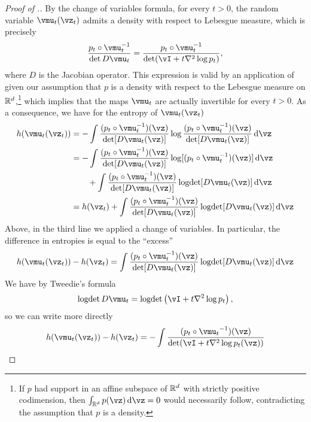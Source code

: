 \documentclass[../../book-main.tex]{subfiles}
\begin{document}
\begin{proof}[Proof of {}.]
  By the change of variables formula, for every $t>0$, the random variable
  $\vmu_t(\vz_t)$ admits a density with respect to Lebesgue measure, which is
  precisely
  \begin{equation*}
    \frac{p_t \circ \vmu_t^{-1}}{\det D \vmu_t}
    =
    \frac{p_t \circ \vmu_t^{-1}}{\det(\vI + t \nabla^2 \log p_t)},
  \end{equation*}
  where \(D\) is the Jacobian operator.
  This expression is valid by an application of \cite[Lemma
  II.1]{Gribonval2011-pf} given our assumption that $p$ is a density with respect
  to the Lebesgue measure on $\mathbb{R}^d$,\footnote{If $p$ had support in an affine
  subspace of $\mathbb{R}^d$ with strictly positive codimension, then $\int_{\R^d}
  p(\vz)\odif \vz = 0$ would necessarily follow, contradicting the assumption that $p$ is
  a density.} which implies
  that the maps $\vmu_t$ are actually invertible for every $t>0$. As
  a consequence, we have for the entropy of $\vmu_t(\vz_t)$
  \begin{align*}
    h(\vmu_t(\vz_t))
    &=
    - \int \frac{(p_t \circ \vmu_t^{-1})(\vz)}{\det[D \vmu_t(\vz)]}
    \log \frac{(p_t \circ \vmu_t^{-1})(\vz)}{\det[D \vmu_t(\vz)]}\odif{\vz}
    \\
    &=
    - \int \frac{(p_t \circ \vmu_t^{-1})(\vz)}{\det[D\vmu_t(\vz)]}
    \log[(p_t \circ \vmu_t^{-1})(\vz)]\odif{\vz} \\
    &\qquad +
    \int \frac{(p_t \circ \vmu_t^{-1})(\vz)}{\det[D\vmu_t(\vz)]}
    \logdet[D\vmu_t(\vz)]\odif{\vz}
    \\
    &=
    h(\vz_t)
    +
    \int \frac{(p_t \circ \vmu_t^{-1})(\vz)}{\det[D\vmu_t(\vz)]}
    \logdet[D\vmu_t(\vz)]\odif{\vz}
  \end{align*}
  Above, in the third line we applied a change of variables.
  In particular, the difference in entropies is equal to the ``excess''
  \begin{equation*}
    h(\vmu_t(\vz_t))
    -
    h(\vz_t)
    =
    \int \frac{(p_t \circ \vmu_t^{-1})(\vz)}{\det[D\vmu_t(\vz)]}
    \logdet[D\vmu_t(\vz)]\odif{\vz}
  \end{equation*}
  We have by Tweedie's formula
  \begin{equation*}
    \logdet {D \vmu_t}
    =
    \logdet \left(
      \vI + t \nabla^2\log p_t
    \right),
  \end{equation*}
  so we can write more directly
  \begin{equation*}
    h(\vmu_t(\vz_t))
    -
    h(\vz_t)
    =
    -\int
    \frac{(p_t \circ {\vmu_t}^{-1})(\vz)}{\det( \vI + t \nabla^2 \log p_t(\vz))}

\end{equation*}
\end{proof}
\end{document}

